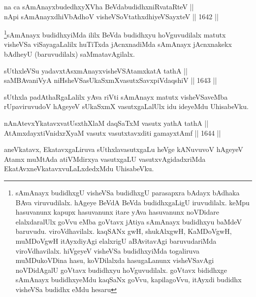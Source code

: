 \begin{shl}
na ca sAmAnayxbudedhxyXVha BeVdabudidhxniRvataRteV || \\
nApi sAmAnayxdhiVbAdhoV visheVSoVtathxdhiyeVSayxteV \hfill || 1642 ||  
\end{shl}

\begin{artha}
\footnote{sAmAnayx budidhxgU visheVSa budidhxgU parasapxra bAdayx bAdhaka BAva viruvudilalx. hAgeye BeVdA BeVda budidhxgaLigU iruvudilalx. keMpu hasuvanunx kapupx hasuvanunx itare yAva hasuvanunx noVDidare elalxdaralUlx goVvu eMba goVtavx jAtiya sAmAnayx budidhxyu baMdeV baruvudu. viroVdhavilalx. kaqSANx gwH, shukAlxgwH, KaMDoVgwH, muMDoVgwH itAyxdiyAgi elalxrigU aBAvitavAgi baruvudariMda viroVdhavilalx. hiVgeyeV visheVSa budidhxyiMda togaliruva muMDukoVDina hasu, koVDilalxda hasugaLanunx visheVSavAgi noVDidAgalU goVtavx budidhxyu hoVguvudilalx. goVtavx bididhxge sAmAnayx budidhxyeMdu kaqSaNx goVvu, kapilagoVvu, itAyxdi budidhx visheVSa budidhx eMdu hesaru}sAmAnayx budidhxyiMda ililx BeVda budidhxyu hoVguvudilalx matutx visheVSa viSayagaLalilx huTiTxda jAcnxnadiMda sAmAnayx jAcnxnakekx bAdheyU (baruvudilalx) saMmatavAgilalx.
\end{artha}


\begin{shl}
sUthxleVSu yadavxtAsxmAnayxvisheVSAtamxkatA tathA || \\
saMBAvaniVyA niHsheVSasUkaSxmXvasutxSavxpiVdaqshiV \hfill || 1643 ||  
\end{shl}

\begin{artha}
sUthxla padAthaRgaLalilx yAva riVti sAmAnayx matutx visheVSaveMba rUpaviruvudoV hAgeyeV sUkaSxmX vasutxgaLalUlx idu ideyeMdu UhisabeVku.
\end{artha}


\begin{shl}
nAnAtevxYkatavxvatUsxthXlaM daqSaTxM vasutx yathA tathA ||  \\
AtAmxdayxtiVnidxrXyaM vasutx vasutxtavxditi gamayxtAmf \hfill || 1644 ||  
\end{shl}

\begin{artha}
aneVkatavx, EkatavxgaLiruva sUthxlavasutxgaLu heVge kANuvuvoV hAgeyeV Atamx muMtAda atiVMdirxya vasutxgaLU vasutxvAgidadxriMda EkatAvxneVkatavxvuLaLxdedxMdu UhisabeVku.
\end{artha}

